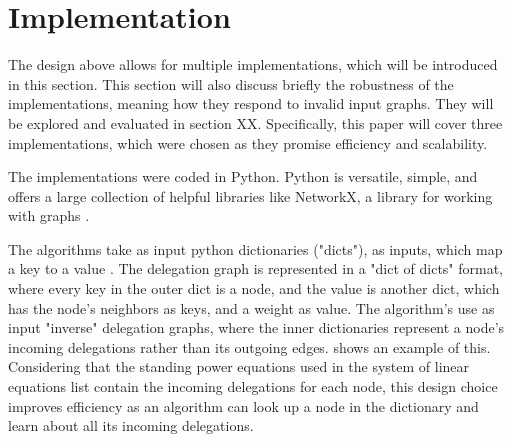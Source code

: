 \graphicspath{{./figures/}}

\chapter{Implementation}

The design above allows for multiple implementations, which will be introduced in this section. This section will also discuss briefly the robustness of the implementations, meaning how they respond to invalid input graphs. They will be explored and evaluated in section XX. Specifically, this paper will cover three implementations, which were chosen as they promise efficiency and scalability.

The implementations were coded in Python. Python is versatile, simple, and offers a large collection of helpful libraries like NetworkX, a library for working with graphs \cite{hagbergExploringNetworkStructure2008}. 

The algorithms take as input python dictionaries ("dicts"), as inputs, which map a key to a value \cite{pythonsoftwarefoundationPythonTutorialSection}. The delegation graph is represented in a "dict of dicts" format, where every key in the outer dict is a node, and the value is another dict, which has the node's neighbors as keys, and a weight as value. The algorithm's use as input "inverse" delegation graphs, where the inner dictionaries represent a node's incoming delegations rather than its outgoing edges.  shows an example of this. Considering that the standing power equations used in the system of linear equations list contain the incoming delegations for each node, this design choice improves efficiency as an algorithm can look up a node in the dictionary and learn about all its incoming delegations.

